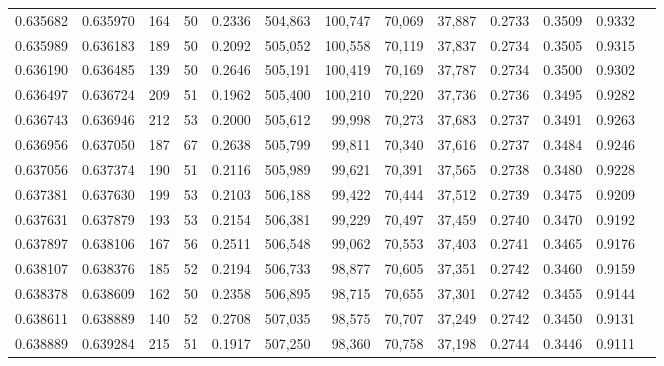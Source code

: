 \begin{tabular}{rrrrrrrrrrrrr}
0.635682 & 0.635970 &    164 &    50 &                                     0.2336 & 504,863 & 100,747 &  70,069 &  37,887 & 0.2733 & 0.3509 & 0.9332 \\
0.635989 & 0.636183 &    189 &    50 &                                     0.2092 & 505,052 & 100,558 &  70,119 &  37,837 & 0.2734 & 0.3505 & 0.9315 \\
0.636190 & 0.636485 &    139 &    50 &                                     0.2646 & 505,191 & 100,419 &  70,169 &  37,787 & 0.2734 & 0.3500 & 0.9302 \\
0.636497 & 0.636724 &    209 &    51 &                                     0.1962 & 505,400 & 100,210 &  70,220 &  37,736 & 0.2736 & 0.3495 & 0.9282 \\
0.636743 & 0.636946 &    212 &    53 &                                     0.2000 & 505,612 &  99,998 &  70,273 &  37,683 & 0.2737 & 0.3491 & 0.9263 \\
0.636956 & 0.637050 &    187 &    67 &                                     0.2638 & 505,799 &  99,811 &  70,340 &  37,616 & 0.2737 & 0.3484 & 0.9246 \\
0.637056 & 0.637374 &    190 &    51 &                                     0.2116 & 505,989 &  99,621 &  70,391 &  37,565 & 0.2738 & 0.3480 & 0.9228 \\
0.637381 & 0.637630 &    199 &    53 &                                     0.2103 & 506,188 &  99,422 &  70,444 &  37,512 & 0.2739 & 0.3475 & 0.9209 \\
0.637631 & 0.637879 &    193 &    53 &                                     0.2154 & 506,381 &  99,229 &  70,497 &  37,459 & 0.2740 & 0.3470 & 0.9192 \\
0.637897 & 0.638106 &    167 &    56 &                                     0.2511 & 506,548 &  99,062 &  70,553 &  37,403 & 0.2741 & 0.3465 & 0.9176 \\
0.638107 & 0.638376 &    185 &    52 &                                     0.2194 & 506,733 &  98,877 &  70,605 &  37,351 & 0.2742 & 0.3460 & 0.9159 \\
0.638378 & 0.638609 &    162 &    50 &                                     0.2358 & 506,895 &  98,715 &  70,655 &  37,301 & 0.2742 & 0.3455 & 0.9144 \\
0.638611 & 0.638889 &    140 &    52 &                                     0.2708 & 507,035 &  98,575 &  70,707 &  37,249 & 0.2742 & 0.3450 & 0.9131 \\
0.638889 & 0.639284 &    215 &    51 &                                     0.1917 & 507,250 &  98,360 &  70,758 &  37,198 & 0.2744 & 0.3446 & 0.9111 \\

\end{tabular}
